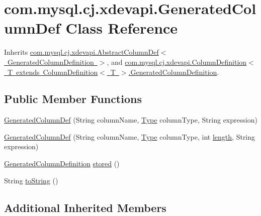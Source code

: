 \hypertarget{classcom_1_1mysql_1_1cj_1_1xdevapi_1_1_generated_column_def}{}\section{com.\+mysql.\+cj.\+xdevapi.\+Generated\+Column\+Def Class Reference}
\label{classcom_1_1mysql_1_1cj_1_1xdevapi_1_1_generated_column_def}


Inherits \mbox{\hyperlink{classcom_1_1mysql_1_1cj_1_1xdevapi_1_1_abstract_column_def}{com.\+mysql.\+cj.\+xdevapi.\+Abstract\+Column\+Def$<$ Generated\+Column\+Definition $>$}}, and \mbox{\hyperlink{interfacecom_1_1mysql_1_1cj_1_1xdevapi_1_1_column_definition_1_1_generated_column_definition}{com.\+mysql.\+cj.\+xdevapi.\+Column\+Definition$<$ T extends Column\+Definition$<$ T $>$.\+Generated\+Column\+Definition}}.

\subsection*{Public Member Functions}
\begin{DoxyCompactItemize}
\item 
\mbox{\hyperlink{classcom_1_1mysql_1_1cj_1_1xdevapi_1_1_generated_column_def_a6c25988b13f6cf4248242e47b53a59bc}{Generated\+Column\+Def}} (String column\+Name, \mbox{\hyperlink{enumcom_1_1mysql_1_1cj_1_1xdevapi_1_1_type}{Type}} column\+Type, String expression)
\item 
\mbox{\hyperlink{classcom_1_1mysql_1_1cj_1_1xdevapi_1_1_generated_column_def_adadc19076333f1ce25f7adc836bc059d}{Generated\+Column\+Def}} (String column\+Name, \mbox{\hyperlink{enumcom_1_1mysql_1_1cj_1_1xdevapi_1_1_type}{Type}} column\+Type, int \mbox{\hyperlink{classcom_1_1mysql_1_1cj_1_1xdevapi_1_1_abstract_column_def_a78d0c29138f467d0a661dacc2700ceab}{length}}, String expression)
\item 
\mbox{\hyperlink{interfacecom_1_1mysql_1_1cj_1_1xdevapi_1_1_column_definition_1_1_generated_column_definition}{Generated\+Column\+Definition}} \mbox{\hyperlink{classcom_1_1mysql_1_1cj_1_1xdevapi_1_1_generated_column_def_a7518aecc43b11bfa3f23ada2721fd845}{stored}} ()
\item 
String \mbox{\hyperlink{classcom_1_1mysql_1_1cj_1_1xdevapi_1_1_generated_column_def_a65933e6c35c706b35df70c6404f88e8a}{to\+String}} ()
\end{DoxyCompactItemize}
\subsection*{Additional Inherited Members}


